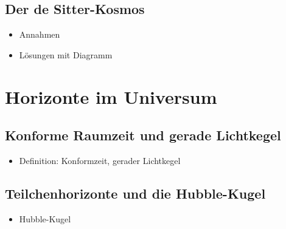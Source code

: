 \documentclass{article}
\begin{document}
\begin{multicols}{2}
    \subsection{Der de Sitter-Kosmos} %
    \label{sub:der_de_sitter_kosmos}
      \begin{itemize}
        \item Annahmen
        \item Lösungen mit Diagramm
      \end{itemize}

  \section{Horizonte im Universum} %
  \label{sec:horizonte_im_universum}
    \subsection{Konforme Raumzeit und gerade Lichtkegel} %
    \label{sub:konforme_raumzeit_und_gerade_lichtkegel}
      \begin{itemize}
        \item Definition: Konformzeit, gerader Lichtkegel
      \end{itemize}

    \subsection{Teilchenhorizonte und die Hubble-Kugel} %
    \label{sub:teilchenhorizonte_und_die_hubble_kugel}
      \begin{itemize}
        \item Hubble-Kugel
      \end{itemize}

  \end{multicols}
\end{document}
